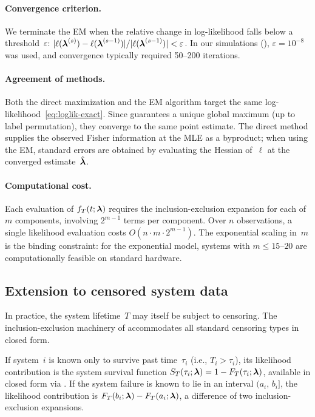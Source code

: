 \paragraph{Convergence criterion.}
We terminate the EM when the relative change in log-likelihood falls
below a threshold~$\varepsilon$:
$|\ell(\boldsymbol{\lambda}^{(s)}) - \ell(\boldsymbol{\lambda}^{(s-1)})| / |\ell(\boldsymbol{\lambda}^{(s-1)})| < \varepsilon$.
In our simulations (), $\varepsilon = 10^{-8}$
was used, and convergence typically required 50--200 iterations.

\paragraph{Agreement of methods.}
Both the direct maximization and the EM
algorithm target the same log-likelihood~\eqref{eq:loglik-exact}.  Since
 guarantees a unique global maximum
(up to label permutation), they converge to the same point estimate.
The direct method supplies the observed Fisher information at the MLE
as a byproduct; when using the EM, standard errors are obtained by
evaluating the Hessian of~$\ell$ at the converged estimate~$\hat{\boldsymbol{\lambda}}$.

\paragraph{Computational cost.}
Each evaluation of $f_T(t;\boldsymbol{\lambda})$ requires
the inclusion-exclusion expansion for each of $m$ components, involving
$2^{m-1}$ terms per component.  Over $n$ observations, a single
likelihood evaluation costs $O(n \cdot m \cdot 2^{m-1})$.  The
exponential scaling in~$m$ is the binding constraint: for the
exponential model, systems with $m \leq 15$--$20$ are computationally
feasible on standard hardware.

\subsection{Extension to censored system data}
\label{sub:censored-extension}

In practice, the system lifetime~$T$ may itself be subject to censoring.
The inclusion-exclusion machinery of 
accommodates all standard censoring types in closed form.

If system~$i$ is known only to survive past time~$\tau_i$
(i.e., $T_i > \tau_i$), its likelihood contribution is the system
survival function
$S_T(\tau_i;\boldsymbol{\lambda}) = 1 - F_T(\tau_i;\boldsymbol{\lambda})$,
available in closed form via .
If the system failure is known to lie in an interval $(a_i,\, b_i]$,
the likelihood contribution is
$F_T(b_i;\boldsymbol{\lambda}) - F_T(a_i;\boldsymbol{\lambda})$,
a difference of two inclusion-exclusion expansions.

